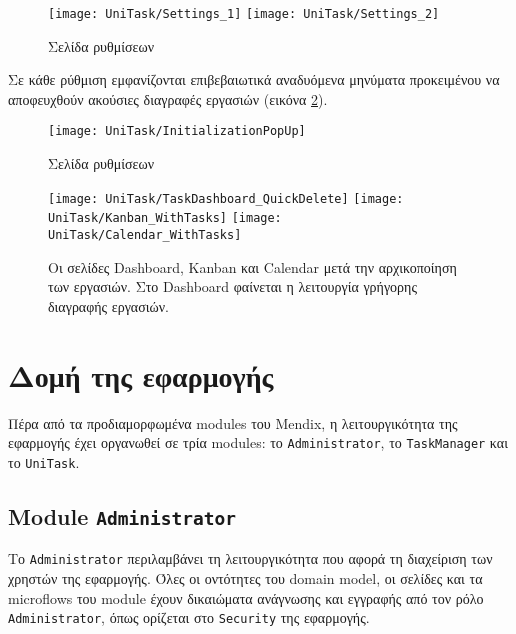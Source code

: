         \begin{figure}[h!] \noindent \centering
            \texttt{[image: UniTask/Settings\_1]}
            \texttt{[image: UniTask/Settings\_2]}
            \caption{\centering Σελίδα ρυθμίσεων}
            \label{fig:unitask_Settings}
        \end{figure}

        Σε κάθε ρύθμιση εμφανίζονται επιβεβαιωτικά αναδυόμενα μηνύματα προκειμένου να αποφευχθούν ακούσιες διαγραφές εργασιών (εικόνα \ref{fig:unitask_InitializationPopUp}).

        \begin{figure}[h!] \noindent \centering
            \texttt{[image: UniTask/InitializationPopUp]}
            \caption{\centering Σελίδα ρυθμίσεων}
            \label{fig:unitask_InitializationPopUp}
        \end{figure}

        \begin{figure}[p!] \noindent \centering
            \texttt{[image: UniTask/TaskDashboard\_QuickDelete]}
            \texttt{[image: UniTask/Kanban\_WithTasks]}
            \texttt{[image: UniTask/Calendar\_WithTasks]}
            \caption{\centering Οι σελίδες Dashboard, Kanban και Calendar μετά την αρχικοποίηση των εργασιών. Στο Dashboard φαίνεται η λειτουργία γρήγορης διαγραφής εργασιών.}
            \label{fig:unitask_Dashboard_Kanban_Calendar_WithTasks}
        \end{figure}

    \section{Δομή της εφαρμογής} \label{sec:unitask_mendix}
        Πέρα από τα προδιαμορφωμένα modules του Mendix, η λειτουργικότητα της εφαρμογής έχει οργανωθεί σε τρία modules: το \texttt{Administrator}, το \texttt{TaskManager} και το \texttt{UniTask}.

        \subsection{Module \texttt{Administrator}}
            Το \texttt{Administrator} περιλαμβάνει τη λειτουργικότητα που αφορά τη διαχείριση των χρηστών της εφαρμογής. Όλες οι οντότητες του domain model, οι σελίδες και τα microflows του module έχουν δικαιώματα ανάγνωσης και εγγραφής από τον ρόλο \texttt{Administrator}, όπως ορίζεται στο \texttt{Security} της εφαρμογής.

